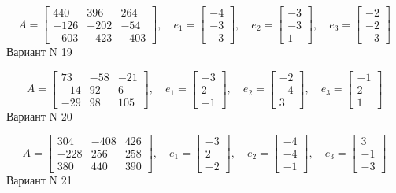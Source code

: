 \documentclass[11pt]{report}
\begin{document}
$$A = \left[\begin{matrix}440 & 396 & 264\\-126 & -202 & -54\\-603 & -423 & -403\end{matrix}\right],\quad e_1 = \left[\begin{matrix}-4\\-3\\-3\end{matrix}\right],\quad e_2 = \left[\begin{matrix}-3\\-3\\1\end{matrix}\right],\quad e_3 = \left[\begin{matrix}-2\\-2\\-3\end{matrix}\right]$$Вариант N 19

$$A = \left[\begin{matrix}73 & -58 & -21\\-14 & 92 & 6\\-29 & 98 & 105\end{matrix}\right],\quad e_1 = \left[\begin{matrix}-3\\2\\-1\end{matrix}\right],\quad e_2 = \left[\begin{matrix}-2\\-4\\3\end{matrix}\right],\quad e_3 = \left[\begin{matrix}-1\\2\\1\end{matrix}\right]$$Вариант N 20

$$A = \left[\begin{matrix}304 & -408 & 426\\-228 & 256 & 258\\380 & 440 & 390\end{matrix}\right],\quad e_1 = \left[\begin{matrix}-3\\2\\-2\end{matrix}\right],\quad e_2 = \left[\begin{matrix}-4\\-4\\-1\end{matrix}\right],\quad e_3 = \left[\begin{matrix}3\\-1\\-3\end{matrix}\right]$$Вариант N 21
\end{document}
